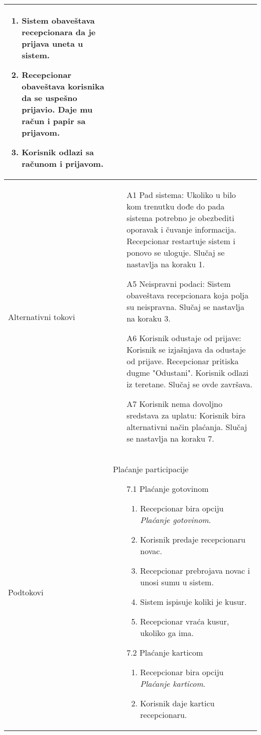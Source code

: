 \documentclass[../../main.tex]{subfiles}
\begin{document}
\begin{longtable}{| p{} | p{} |}
\begin{enumerate}
        \item Sistem obaveštava recepcionara da je prijava uneta u sistem.
        \item Recepcionar obaveštava korisnika da se uspešno prijavio. Daje mu račun i papir sa prijavom.
        \item Korisnik odlazi sa računom i prijavom.
    \end{enumerate}\\
\hline
    Alternativni tokovi & \begin{itemize}
        \item[A1] Pad sistema: Ukoliko u bilo kom trenutku dođe do pada sistema potrebno je obezbediti oporavak i čuvanje informacija. Recepcionar restartuje sistem i ponovo se uloguje. Slučaj se nastavlja na koraku 1.
        \item[A5] Neispravni podaci: Sistem obaveštava recepcionara koja polja su neispravna. Slučaj se nastavlja na koraku 3.
        \item[A6] Korisnik odustaje od prijave: Korisnik se izjašnjava da odustaje od prijave. Recepcionar pritiska dugme "Odustani". Korisnik odlazi iz teretane. Slučaj se ovde završava.
        \item[A7] Korisnik nema dovoljno sredstava za uplatu: Korisnik bira alternativni način plaćanja. Slučaj se nastavlja na koraku 7.
    \end{itemize}\\
\hline
    Podtokovi & Plaćanje participacije\begin{itemize}
        \item[7.1] Plaćanje gotovinom \begin{enumerate}
            \item Recepcionar bira opciju \textit{Plaćanje gotovinom}.
            \item Korisnik predaje recepcionaru novac.
            \item Recepcionar prebrojava novac i unosi sumu u sistem.
            \item Sistem ispisuje koliki je kusur.
            \item Recepcionar vraća kusur, ukoliko ga ima.
        \end{enumerate} 
        \item[7.2] Plaćanje karticom \begin{enumerate}
            \item Recepcionar bira opciju \textit{Plaćanje karticom}.
            \item Korisnik daje karticu recepcionaru.

\end{enumerate}
\end{itemize}
\end{longtable}
\end{document}
